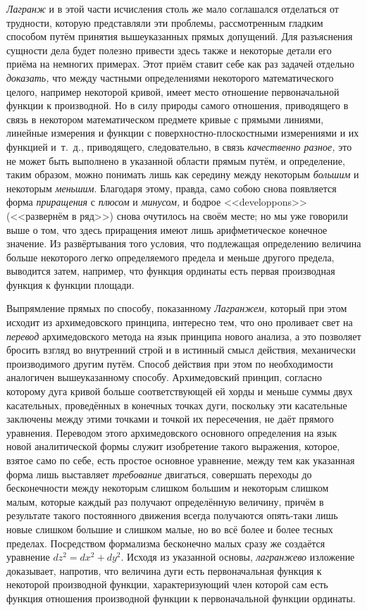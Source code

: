 {\em Лагранж} и в этой части исчисления столь же мало соглашался отделаться от
трудности, которую представляли эти проблемы, рассмотренным гладким способом
путём принятия вышеуказанных прямых допущений. Для разъяснения сущности дела
будет полезно привести здесь также и некоторые детали его приёма на немногих
примерах. Этот приём ставит себе как раз задачей отдельно {\em доказать,} что
между частными определениями некоторого математического целого, например
некоторой кривой, имеет место отношение первоначальной функции к производной.
Но в силу природы самого отношения, приводящего в связь в некотором
математическом предмете кривые с прямыми линиями, линейные измерения и функции
с поверхностно-плоскостными измерениями и их функцией и~т.~д., приводящего,
следовательно, в связь {\em качественно разное,} это не может быть выполнено в
указанной области прямым путём, и определение, таким образом, можно понимать
лишь как середину между некоторым {\em большим} и некоторым {\em меньшим}.
Благодаря этому, правда, само собою снова появляется форма {\em приращения} с
{\em плюсом} и {\em минусом,} и бодрое <<developpons>> (<<развернём в ряд>>)
снова очутилось на своём месте; но мы уже говорили выше о том, что здесь
приращения имеют лишь арифметическое конечное значение. Из развёртывания того
условия, что подлежащая определению величина больше некоторого легко
определяемого предела и меньше другого предела, выводится затем, например, что
функция ординаты есть первая производная функция к функции площади.

Выпрямление прямых по способу, показанному {\em Лагранжем,} который при этом
исходит из архимедовского принципа, интересно тем, что оно проливает свет на
{\em перевод} архимедовского метода на язык принципа нового анализа, а это
позволяет бросить взгляд во внутренний строй и в истинный смысл действия,
механически производимого другим путём. Способ действия при этом по
необходимости аналогичен вышеуказанному способу. Архимедовский принцип,
согласно которому дуга кривой больше соответствующей ей хорды и меньше суммы
двух касательных, проведённых в конечных точках дуги, поскольку эти касательные
заключены между этими точками и точкой их пересечения, не даёт прямого
уравнения. Переводом этого архимедовского основного определения на язык новой
аналитической формы служит изобретение такого выражения, которое, взятое само
по себе, есть простое основное уравнение, между тем как указанная форма лишь
выставляет {\em требование} двигаться, совершать переходы до бесконечности
между некоторым слишком большим и некоторым слишком малым, которые каждый раз
получают определённую величину, причём в результате такого постоянного движения
всегда получаются опять-таки лишь новые слишком большие и слишком малые, но во
всё более и более тесных пределах. Посредством формализма бесконечно малых
сразу же создаётся уравнение $dz^2=dx^2+dy^2$. Исходя из указанной основы,
{\em лагранжево} изложение доказывает, напротив, что величина дуги есть
первоначальная функция к некоторой производной функции, характеризующий член
которой сам есть функция отношения производной функции к первоначальной функции
ординаты.

